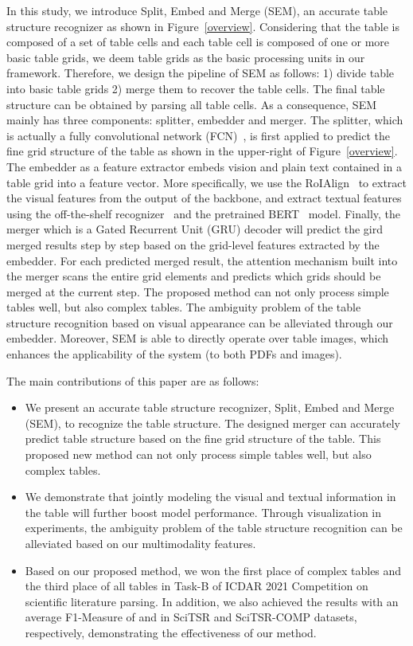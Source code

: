 \documentclass[review]{elsarticle}
\begin{document}
In this study, we introduce Split, Embed and Merge (SEM), an accurate table structure recognizer as shown in Figure~\ref{overview}. Considering that the table is composed of a set of table cells and each table cell is composed of one or more basic table grids, we deem table grids as the basic processing units in our framework. Therefore, we design the pipeline of SEM as follows: 1) divide table into basic table grids 2) merge them to recover the table cells. The final table structure can be obtained by parsing all table cells. As a consequence, SEM mainly has three components: splitter, embedder and merger. The splitter, which is actually a fully convolutional network (FCN)~\cite{FCN}, is first applied to predict the fine grid structure of the table as shown in the upper-right of Figure~\ref{overview}. The embedder as a feature extractor embeds vision and plain text contained in a table grid into a feature vector. More specifically, we use the RoIAlign~\cite{MaskRCNN} to extract the visual features from the output of the backbone, and extract textual features using the off-the-shelf recognizer~\cite{WAP} and the pretrained BERT~\cite{Bert} model. Finally, the merger which is a Gated Recurrent Unit (GRU) decoder will predict the gird merged results step by step based on the grid-level features extracted by the embedder. For each predicted merged result, the attention mechanism built into the merger scans the entire grid elements and predicts which grids should be merged at the current step. The proposed method can not only process simple tables well, but also complex tables. The ambiguity problem of the table structure recognition based on visual appearance can be alleviated through our embedder. Moreover, SEM is able to directly operate over table images, which enhances the applicability of the system (to both PDFs and images).

The main contributions of this paper are as follows:
\begin{itemize}
	
	\item 
	We present an accurate table structure recognizer, Split, Embed and Merge (SEM), to recognize the table structure. The designed merger can accurately predict table structure based on the fine grid structure of the table. This proposed new method can not only process simple tables well, but also complex tables.
	
	\item
	We demonstrate that jointly modeling the visual and textual information in the table will further boost model performance. Through visualization in experiments, the ambiguity problem of the table structure recognition can be alleviated based on our multimodality features.
	
	\item 
	Based on our proposed method, we won the first place of complex tables and the third place of all tables in Task-B of ICDAR 2021 Competition on scientific literature parsing. In addition, we also achieved the results with an average F1-Measure of  and  in SciTSR and SciTSR-COMP datasets, respectively, demonstrating the effectiveness of our method.
	
\end{itemize}
\end{document}
